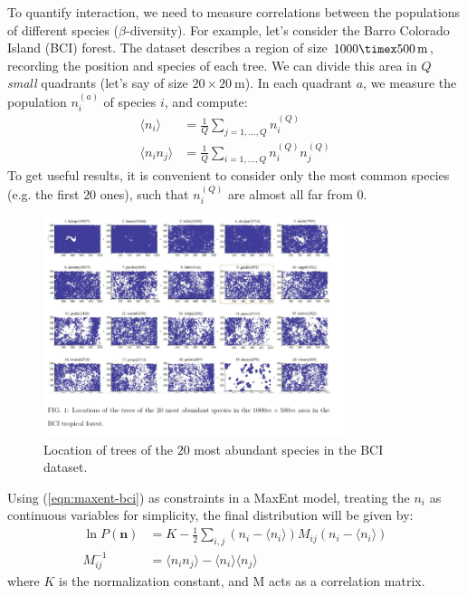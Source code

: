 \documentclass[../../main.tex]{subfiles}
\begin{document}
\medskip

To quantify interaction, we need to measure correlations between the populations of different species ($\beta$-diversity). For example, let's consider the Barro Colorado Island (BCI) forest. The dataset describes a region of size $\num{1000}\timex\SI{500}{\m}$, recording the position and species of each tree. We can divide this area in $Q$ \textit{small} quadrants (let's say of size $\num{20}\times\SI{20}{\m}$). In each quadrant $a$, we measure the population $n_i^{(a)}$ of species $i$, and compute:
\begin{align}\label{eqn:maxent-bci}
    \langle n_i \rangle &= \frac{1}{Q} \sum_{j=1,\dots,Q} n_i^{(Q)}\\
    \langle n_i n_j \rangle &= \frac{1}{Q} \sum_{i=1,\dots,Q} n_i^{(Q)} n_j^{(Q)} \nonumber
\end{align}
To get useful results, it is convenient to consider only the most common species (e.g. the first $20$  ones), such that $n_i^{(Q)}$ are almost all far from $0$.

\begin{figure}[H]
    \centering
    \includegraphics[width=0.8\textwidth]{tree-location.png}
    \caption{Location of trees of the $20$ most abundant species in the BCI dataset.}
    \label{fig:tree-location}
\end{figure}

Using (\ref{eqn:maxent-bci}) as constraints in a MaxEnt model, treating the $n_i$ as continuous variables for simplicity, the final distribution will be given by:
\begin{align*}
    \ln P(\bm{n}) &= K - \frac{1}{2} \sum_{i,j} (n_i - \langle n_i \rangle) M_{ij} (n_i - \langle n_i \rangle)\\
    M_{ij}^{-1} &= \langle n_i n_j \rangle - \langle n_i \rangle \langle n_j \rangle
\end{align*}
where $K$ is the normalization constant, and $\mathrm{M}$ acts as a correlation matrix. 
\end{document}
